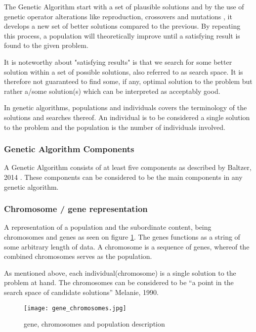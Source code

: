 The Genetic Algorithm start with a set of plausible solutions and by the use of genetic operator alterations like reproduction, crossovers and mutations \cite{Baltzer2014}, it develops a new set of better solutions compared to the previous. By repeating this process, a population will theoretically improve until a satisfying result is found to the given problem. \cite{BCS2013}

It is noteworthy about "satisfying results" is that we search for some better solution within a set of possible solutions, also referred to as search space. It is therefore not guaranteed to find some, if any, optimal solution to the problem but rather a/some solution(s) which can be interpreted as acceptably good. \cite[pp. 20/21]{Sivanandam2008}


In genetic algorithms, populations and individuals covers the terminology of the solutions and searches thereof. An individual is to be considered a single solution to the problem and the population is the number of individuals involved. \cite[pp. 39]{Sivanandam2008}



\subsubsection{Genetic Algorithm Components}

A Genetic Algorithm consists of at least five components as described by Baltzer, 2014 \cite{Baltzer2014}. These components can be considered to be the main components in any genetic algorithm.


\subsubsection*{Chromosome / gene representation}

A representation of a population and the subordinate content, being chromosomes and genes as seen on figure \ref{fig:gene}.
The genes functions as a string of some arbitrary length of data. A chromosome is a sequence of genes, whereof the combined chromosomes serves as the population. \cite[pp. 41]{Sivanandam2008}

As mentioned above, each individual(chromosome) is a single solution to the problem at hand. The chromosomes can be considered to be \enquote{a point in the search space of candidate solutions} \cite[pp. 7]{Melanie1990} Melanie, 1990.


\begin{figure}[!htbp]
\centering
\texttt{[image: gene\_chromosomes.jpg]}
\caption{gene, chromosomes and population description}
\label{fig:gene}
\end{figure}

